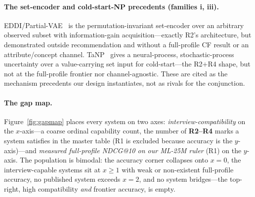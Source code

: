 \documentclass[11pt]{article}
\begin{document}
\paragraph{The set-encoder and cold-start-NP precedents (families i, iii).}
EDDI/Partial-VAE~\cite{ma2019eddi} is the permutation-invariant set-encoder over an arbitrary observed subset with
information-gain acquisition---exactly R2's architecture, but demonstrated outside recommendation and without a full-profile
CF result or an attribute/concept channel. TaNP~\cite{lin2021tanp} gives a neural-process, stochastic-process
uncertainty over a value-carrying set input for cold-start---the R2$+$R4 shape, but not at the full-profile frontier nor
channel-agnostic. These are cited as the mechanism precedents our design instantiates, not as rivals for the
conjunction.

\paragraph{The gap map.}
Figure~\ref{fig:gapmap} places every system on two axes: \emph{interview-compatibility} on the $x$-axis---a coarse
ordinal capability count, the number of \textbf{R2--R4} marks a system satisfies in the master table
(R1 is excluded because accuracy is the $y$-axis)---and \emph{measured full-profile NDCG@10 on our
ML-25M ruler} (R1) on the $y$-axis. The population is bimodal: the accuracy corner collapses onto $x{=}0$, the
interview-capable systems sit at $x\ge1$ with weak or non-existent full-profile accuracy, no published system
exceeds $x{=}2$, and no system bridges---the top-right, high compatibility \emph{and} frontier accuracy, is
empty.
\end{document}
